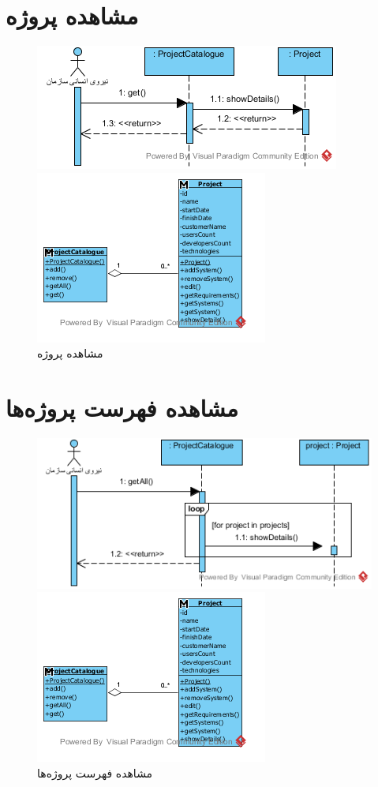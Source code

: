 \section{مشاهده پروژه}
\begin{figure}[H]
	\centering
	\includegraphics[scale=0.8]{img/sequence-analysis/ViewProject}
	
	
	\includegraphics[scale=0.8]{img/sequence-analysis/ViewProjectC}
	\caption{مشاهده پروژه}
\end{figure}


\section{مشاهده فهرست پروژه‌ها}
\begin{figure}[H]
	\centering
	\includegraphics[scale=0.8]{img/sequence-analysis/ViewListOfProjects}
	
	
	\includegraphics[scale=0.8]{img/sequence-analysis/ViewListOfProjectsC}
	\caption{مشاهده فهرست پروژه‌ها}
\end{figure}


